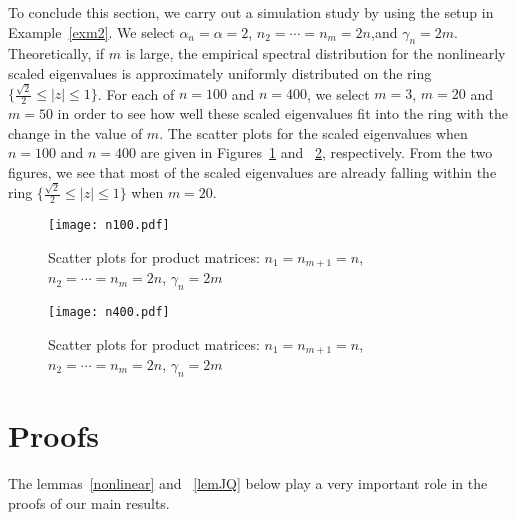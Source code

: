\documentclass[11pt]{article}
\numberwithin{equation}{section}
\begin{document}

To conclude this section, we carry out a simulation study by using
the setup in Example~\ref{exm2}. We select $\alpha_n=\alpha=2$,
$n_2=\cdots=n_m=2n$,and $\gamma_n=2m$.   Theoretically, if $m$ is
large, the empirical spectral distribution for the nonlinearly
scaled eigenvalues is approximately uniformly distributed on the
ring $\{\frac{\sqrt{2}}2\le |z|\le 1\}$.  For each of $n=100$ and
$n=400$, we select $m=3$, $m=20$ and $m=50$ in order to see how well
these scaled eigenvalues fit into the ring with the change in the
value of $m$.  The scatter plots for the scaled eigenvalues when
$n=100$ and $n=400$ are given in Figures~\ref{scatter1} and
~\ref{scatter2}, respectively. From the two figures, we see that
most of the scaled eigenvalues are already falling within the ring
$\{\frac{\sqrt{2}}2\le |z|\le 1\}$ when $m=20$.



\begin{figure}[!h]
\centering \caption{Scatter plots for product matrices:
$n_1=n_{m+1}=n$, $n_2=\cdots=n_m=2n$, $\gamma_n=2m$}
\texttt{[image: n100.pdf]}
\label{scatter1}
\end{figure}

\begin{figure}[!h]
\centering \caption{Scatter plots for product matrices:
$n_1=n_{m+1}=n$, $n_2=\cdots=n_m=2n$, $\gamma_n=2m$}
\texttt{[image: n400.pdf]}
\label{scatter2}
\end{figure}

\section{Proofs}\label{proofs}

The lemmas~\ref{nonlinear} and ~\ref{lemJQ} below play a very
important role in the proofs of our main results.
\end{document}
